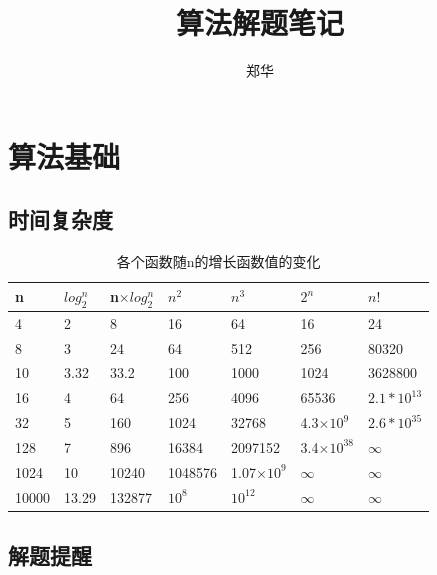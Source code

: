 \documentclass[UTF8,a4paper,12pt]{ctexbook}
\author{\kaishu 郑华}
\title{\heiti 算法解题笔记}
\begin{document}
 	\maketitle
 	\tableofcontents
 	
\chapter{算法基础}
	\section{时间复杂度}
		\begin{table}[h]
			\centering
			\begin{tabular}{|p{2cm}<{\centering}|p{2cm}<{\centering}|p{2cm}<{\centering}|p{2cm}<{\centering}|p{2cm}<{\centering}|p{2cm}<{\centering}|p{2cm}<{\centering}|}	
				\hline
				n & $log_2^n$ & n$\times log_2^n$ & $n^2$ & $n^3$ & $2^n$ & $n!$ \\
				
				\hline
				4 & 2 		  & 8 				  & 16 	  & 64 	  & 16 	  &24 \\
				
				\hline
				8 & 3 		  & 24 				  & 64 	  & 512	  & 256 	  &80320 \\
				
				\hline
				10 & 3.32 	  & 33.2			 & 100 	  & 1000	  & 1024 	  &3628800 \\
				
				\hline
				16 & 4 		  & 64 				  & 256	  & 4096 	  & 65536	  &$2.1*10^{13}$ \\
				
				\hline
				32 & 5 		  & 160 			 & 1024   & 32768 	  & 4.3$\times 10^9$ 	  &$2.6*10^{35}$\\
				
				\hline
				128 & 7 	  & 896 			& 16384   & 2097152 	  & 3.4$\times 10^{38}$ 	  &$\infty$ \\
				
				\hline
				1024 & 10 	  & 10240 			& 1048576 & 1.07$\times 10^9$ 	  & $\infty$ 	  &$\infty$ \\
				
				\hline
				10000 & 13.29 & 132877 			& $10^8$  & $10^{12}$	  & $\infty$ 	  &$\infty$ \\
				\hline
			\end{tabular}
			\caption{各个函数随n的增长函数值的变化}
		\end{table} 
	
	\section{解题提醒}
\end{document}

